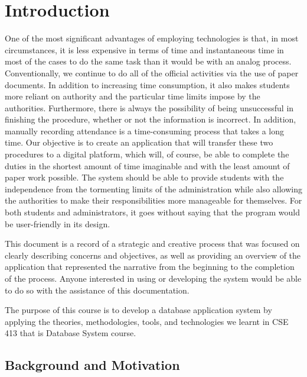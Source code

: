 
\section{Introduction}\label{sec:introduction}
One of the most significant advantages of employing technologies is that, in most circumstances, it is less expensive in terms of time and instantaneous time in most of the cases to do the same task than it would be with an analog process. Conventionally, we continue to do all of the official activities via the use of paper documents. In addition to increasing time consumption, it also makes students more reliant on authority and the particular time limits impose by the authorities. Furthermore, there is always the possibility of being unsuccessful in finishing the procedure, whether or not the information is incorrect. In addition, manually recording attendance is a time-consuming process that takes a long time. Our objective is to create an application that will transfer these two procedures to a digital platform, which will, of course, be able to complete the duties in the shortest amount of time imaginable and with the least amount of paper work possible. The system should be able to provide students with the independence from the tormenting limits of the administration while also allowing the authorities to make their responsibilities more manageable for themselves. For both students and administrators, it goes without saying that the program would be user-friendly in its design.

This document is a record of a strategic and creative process that was focused on clearly describing concerns and objectives, as well as providing an overview of the application that represented the narrative from the beginning to the completion of the process. Anyone interested in using or developing the system would be able to do so with the assistance of this documentation.

The purpose of this course is to develop a database application system by applying the theories, methodologies, tools, and technologies we learnt in CSE 413 that is Database System course.  

\clearpage


\subsection{Background and Motivation}\label{subsec:bm}

